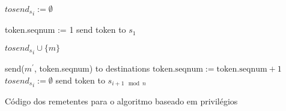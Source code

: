 \begin{algorithm}
\DontPrintSemicolon
{}

${{tosend}_s}_{i} := \emptyset$\;

 {
  token.seqnum := 1\;
  send token to $s_1$\;
}

 {
  ${{tosend}_s}_{i} \cup \{m\}$\;
}

 {
   {
    send(${m}^{\prime}$, token.seqnum) to destinations\;
    $\text{token.seqnum} := \text{token.seqnum} + 1$\;
  }
  ${{tosend}_s}_{i} := \emptyset$\;
  send token to ${s}_{i+1 \mod n}$
}
\caption{Código dos remetentes para o algoritmo baseado em privilégios \cite{journals/csur/DefagoSU04}}
\label{algo:priviledge-based-simple-senders}
\end{algorithm}
